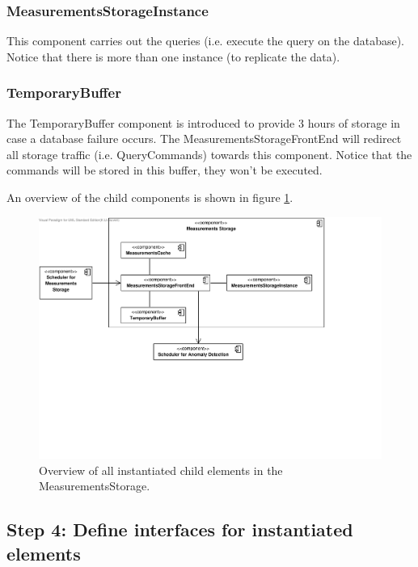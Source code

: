 \subsubsection{MeasurementsStorageInstance}

\npar This component carries out the queries (i.e. execute the query on the
database). Notice that there is more than one instance (to replicate the data).

\subsubsection{TemporaryBuffer}

\npar The TemporaryBuffer component is introduced to provide 3 hours of storage
in case a database failure occurs. The MeasurementsStorageFrontEnd will redirect
all storage traffic (i.e. QueryCommands) towards this component. Notice that the
commands will be stored in this buffer, they won't be executed.

\npar An overview of the child components is shown in figure
\ref{fig:it4/elements}.

\begin{figure}[H]
	\begin{centering}
		\includegraphics[width=\textwidth]{figs/add-it4-elements.pdf}
		\caption{Overview of all instantiated child elements in the
		MeasurementsStorage.}
		\label{fig:it4/elements}
	\end{centering}
\end{figure}

\subsection{Step 4: Define interfaces for instantiated elements}
\label{add:it4/interfaces}

